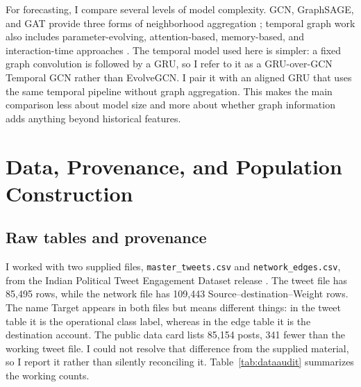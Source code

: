 \documentclass[11pt,a4paper]{article}
\begin{document}
For forecasting, I compare several levels of model complexity. GCN, GraphSAGE, and GAT provide three forms of neighborhood aggregation \citep{kipf2017,hamilton2017,velickovic2018}; temporal graph work also includes parameter-evolving, attention-based, memory-based, and interaction-time approaches \citep{pareja2020,xu2020,rossi2020,kumar2019}. The temporal model used here is simpler: a fixed graph convolution is followed by a GRU, so I refer to it as a GRU-over-GCN Temporal GCN rather than EvolveGCN. I pair it with an aligned GRU that uses the same temporal pipeline without graph aggregation. This makes the main comparison less about model size and more about whether graph information adds anything beyond historical features.

\section{Data, Provenance, and Population Construction}
\subsection{Raw tables and provenance}
I worked with two supplied files, \texttt{master\_tweets.csv} and \texttt{network\_edges.csv}, from the Indian Political Tweet Engagement Dataset release \citep{kaggleipte}. The tweet file has 85,495 rows, while the network file has 109,443 Source--destination--Weight rows. The name Target appears in both files but means different things: in the tweet table it is the operational class label, whereas in the edge table it is the destination account. The public data card lists 85,154 posts, 341 fewer than the working tweet file. I could not resolve that difference from the supplied material, so I report it rather than silently reconciling it. Table~\ref{tab:dataaudit} summarizes the working counts.
\end{document}
